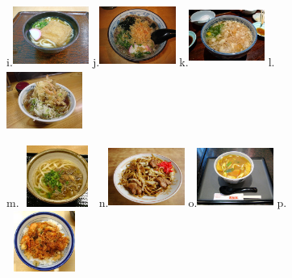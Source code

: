 \documentclass[uplatex,dvipdfmx,b5paper,english,10pt]{jsbook}
\begin{document}
\begin{figure}[htb]
{\begin{flushright}
i.\includegraphics[trim=20 50 20 20, clip, width=25mm, height=20mm]{img/kitsuneudon.jpg}
j.\includegraphics[trim=0 0 0 0, clip,     width=25mm, height=20mm]{img/tanukisoba.jpg}
k.\includegraphics[trim=0 0 0 0, clip,     width=25mm, height=20mm]{img/tanukiudon.jpg}
l.\includegraphics[trim=30 30 10 20, clip, width=25mm, height=20mm]{img/kakiagesoba.jpg}

m.\includegraphics[trim=0 4 0 4, clip,     width=25mm, height=20mm]{img/nikuudon.jpg}
n.\includegraphics[trim=0 3 0 16, clip,    width=25mm, height=20mm]{img/yakisoba.JPG}
o.\includegraphics[trim=20 40 30 4, clip,  width=25mm, height=20mm]{img/curryudon.jpg}
p.\includegraphics[trim=0 0 0 0, clip,     width=25mm, height=20mm]{img/kakiagedon.jpg}


\end{flushright}}
\end{figure}
\end{document}
